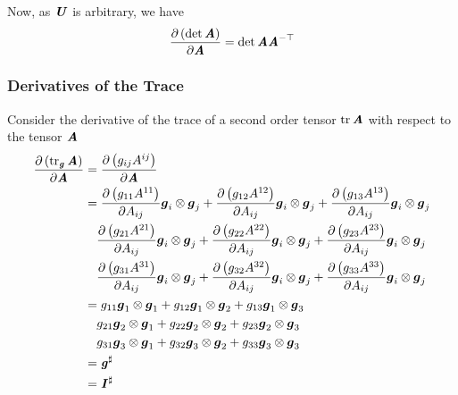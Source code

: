 Now, as $\boldsymbol{\mathit{U}}$ is arbitrary, we have
\begin{equation}
  \delby{\pbrac{\determinant{\tensortwo{A}}}}{\tensortwo{A}}=\determinant{\tensortwo{A}}\invtranspose{\tensortwo{A}}
  \label{eqn:DerivDeterminantTensorSecondOrder}
\end{equation}


\subsubsection{Derivatives of the Trace}
\label{subsubsec:TraceDerivativeSecondOrder}

Consider the derivative of the trace of a second order tensor
$\trace{}{\tensortwo{A}}$ with respect to the tensor $\boldsymbol{\mathit{A}}$ \ie
\begin{equation}
  \begin{split}
    \delby{\pbrac{\trace{\tensortwo{g}}{\tensortwo{A}}}}{\tensortwo{A}}
    &=\delby{\pbrac{g_{ij}A^{ij}}}{\tensortwo{A}}\\
    &=\delby{\pbrac{g_{11}A^{11}}}{A_{ij}}\tensorprod{\vectr{g}_{i}}{\vectr{g}_{j}}
    +\delby{\pbrac{g_{12}A^{12}}}{A_{ij}}\tensorprod{\vectr{g}_{i}}{\vectr{g}_{j}}
    +\delby{\pbrac{g_{13}A^{13}}}{A_{ij}}\tensorprod{\vectr{g}_{i}}{\vectr{g}_{j}} \\
    &\quad\delby{\pbrac{g_{21}A^{21}}}{A_{ij}}\tensorprod{\vectr{g}_{i}}{\vectr{g}_{j}}
    +\delby{\pbrac{g_{22}A^{22}}}{A_{ij}}\tensorprod{\vectr{g}_{i}}{\vectr{g}_{j}}
    +\delby{\pbrac{g_{23}A^{23}}}{A_{ij}}\tensorprod{\vectr{g}_{i}}{\vectr{g}_{j}} \\
    &\quad\delby{\pbrac{g_{31}A^{31}}}{A_{ij}}\tensorprod{\vectr{g}_{i}}{\vectr{g}_{j}}
    +\delby{\pbrac{g_{32}A^{32}}}{A_{ij}}\tensorprod{\vectr{g}_{i}}{\vectr{g}_{j}}
    +\delby{\pbrac{g_{33}A^{33}}}{A_{ij}}\tensorprod{\vectr{g}_{i}}{\vectr{g}_{j}} \\
    &=g_{11}\tensorprod{\vectr{g}_{1}}{\vectr{g}_{1}}
    +g_{12}\tensorprod{\vectr{g}_{1}}{\vectr{g}_{2}}
    +g_{13}\tensorprod{\vectr{g}_{1}}{\vectr{g}_{3}}\\
    &\quad g_{21}\tensorprod{\vectr{g}_{2}}{\vectr{g}_{1}}
    +g_{22}\tensorprod{\vectr{g}_{2}}{\vectr{g}_{2}}
    +g_{23}\tensorprod{\vectr{g}_{2}}{\vectr{g}_{3}}\\
    &\quad g_{31}\tensorprod{\vectr{g}_{3}}{\vectr{g}_{1}}
    +g_{32}\tensorprod{\vectr{g}_{3}}{\vectr{g}_{2}}
    +g_{33}\tensorprod{\vectr{g}_{3}}{\vectr{g}_{3}}\\
    &=\sharptensor{\tensortwo{g}}\\
    &=\sharptensor{\identitytensortwo}
  \end{split}
\end{equation}

